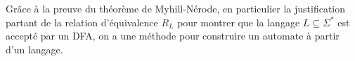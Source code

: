 	\begin{corollary}
		Grâce à la preuve du théorème de Myhill-Nérode, en particulier la justification partant de la relation d'équivalence $R_L$ pour montrer que la langage $L\subseteq\Sigma^*$ est accepté par un DFA, on a une méthode pour construire un automate à partir d'un langage.
	\end{corollary}